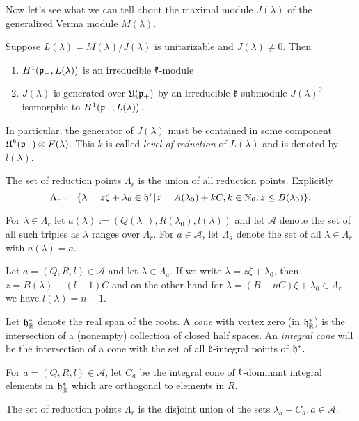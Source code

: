 \documentclass[12pt,a4paper,final]{report}
\begin{document}
Now let's see what we can tell about the maximal module $J(\lambda)$ of the generalized Verma module $M(\lambda)$.
\begin{theorem}
 Suppose $L(\lambda) = M(\lambda)/J(\lambda)$ is unitarizable and $J(\lambda)\neq 0$. Then
 \begin{enumerate}
  \item $H^1(\mathfrak{p}_-,L(\lambda))$ is an irreducible $\mathfrak{k}$-module
  \item $J(\lambda)$ is generated over $\mathfrak{U}(\mathfrak{p}_+)$ by an irreducible $\mathfrak{k}$-submodule $J(\lambda)^0$ isomorphic to $H^1(\mathfrak{p}_-,L(\lambda))$.
 \end{enumerate}
\end{theorem}
In particular, the generator of $J(\lambda)$ must be contained in some component $\mathfrak{U}^k(\mathfrak{p}_+)\otimes F(\lambda)$. This $k$ is called \emph{level of reduction} of $L(\lambda)$ and is denoted by $l(\lambda)$.

\begin{definition}
 The set of reduction points $\Lambda_r$ is the union of all reduction points. Explicitly
 \[
 \Lambda_r := \{ \lambda = z\zeta + \lambda_0 \in \mathfrak{h}^* | z = A(\lambda_0) +kC, k\in\mathbb{N}_0, z \leq B(\lambda_0) \}.
 \]

 For $\lambda \in \Lambda_r$ let $a(\lambda) := (Q(\lambda_0),R(\lambda_0),l(\lambda))$ and let $\mathcal{A}$ denote the set of all such triples as $\lambda$ ranges over $\Lambda_r$. For $a\in\mathcal{A}$, let $\Lambda_a$ denote the set of all $\lambda\in\Lambda_r$ with $a(\lambda)=a$.
\end{definition}

 Let $a=(Q,R,l)\in\mathcal{A}$ and let $\lambda\in\Lambda_a$. If we write $\lambda= z\zeta + \lambda_0$, then $z=B(\lambda)-(l-1)C$ and on the other hand for $\lambda=(B - nC)\zeta + \lambda_0 \in \Lambda_r$ we have $l(\lambda) =n+1$.


Let $\mathfrak{h}^*_{\mathbb{R}}$ denote the real span of the roots. A \emph{cone} with vertex zero (in $\mathfrak{h}^*_{\mathbb{R}}$) is the intersection of a (nonempty) collection of closed half spaces. An \emph{integral cone} will be the intersection of a cone with the set of all $\mathfrak{k}$-integral points of $\mathfrak{h}^*.$

\begin{proposition}
 For $a=(Q,R,l)\in\mathcal{A}$, let $C_a$ be the integral cone of $\mathfrak{k}$-dominant integral elements in $\mathfrak{h}^*_{\mathbb{R}}$ which are orthogonal to elements in $R$.
 
 The set of reduction points $\Lambda_r$ is the disjoint union of the sets $\lambda_a + C_a, a\in\mathcal{A}$.
\end{proposition}
\end{document}
